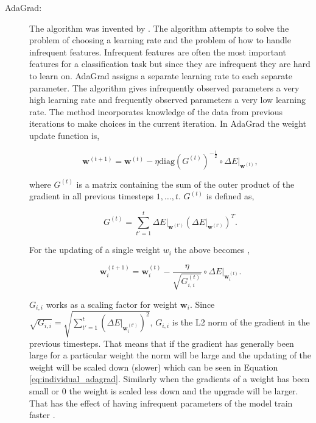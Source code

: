 \begin{description}

    \item[\gls{AdaGrad}:]

        The algorithm was invented by \citet{Duchi:2011:ASM:1953048.2021068}.
        The algorithm attempts to solve the problem of choosing a learning
        rate and the problem of how to handle infrequent features. Infrequent
        features are often the most important features for a classification task
        but since they are infrequent they are hard to learn on. \gls{AdaGrad}
        assigns a separate learning rate to each separate parameter. The
        algorithm gives infrequently observed parameters a very high learning
        rate and frequently observed parameters a very low learning rate. The
        method incorporates knowledge of the data from previous iterations to
        make choices in the current iteration. In \gls{AdaGrad} the weight
        update function is,

        \begin{equation}
            \mathbf{w}^{(t+1)} =
                \mathbf{w}^{(t)} -
                \eta \text{diag}\left(G^{(t)}\right)^{-\frac{1}{2}} \circ
                \Delta E|_{\mathbf{w}^{(t)}},
        \end{equation}

        where $G^{(t)}$ is a matrix containing the sum of the outer product
        of the gradient in all previous timesteps $1, \dots, t$. $G^{(t)}$ is
        defined as,

        \begin{equation}
            G^{(t)} = \sum_{t'=1}^t \Delta E|_{\mathbf{w}^{(t')}}
                \left(
                    \Delta E|_{\mathbf{w}^{(t')}}
                \right)^T.
        \end{equation}

        For the updating of a single weight $w_i$ the above becomes
        \citep{Duchi:2011:ASM:1953048.2021068},

        \begin{equation}
            \label{eq:individual_adagrad}
            \mathbf{w}_i^{(t+1)} =
                \mathbf{w}_i^{(t)} - \frac{\eta}{\sqrt{G^{(t)}_{i,i}}} \circ
                \Delta E|_{\mathbf{w}_i^{(t)}}.
        \end{equation}

        $G_{i,i}$ works as a scaling factor for weight $\mathbf{w}_i$.
        Since $\sqrt{G_{i,i}} = \sqrt{\sum_{t'=1}^t \left(\Delta
        E|_{\mathbf{w}^{(t')}_i}\right)^2}$, $G_{i,i}$ is the L2 norm
        of the gradient in the previous timesteps. That means that if the
        gradient has generally been large for a particular weight the norm
        will be large and the updating of the weight will be scaled down
        (slower) which can be seen in Equation \eqref{eq:individual_adagrad}.
        Similarly when the gradients of a weight has been small or 0 the
        weight is scaled less down and the upgrade will be larger. That has
        the effect of having infrequent parameters of the model train faster
        \citep{Duchi:2011:ASM:1953048.2021068}.


\end{description}
